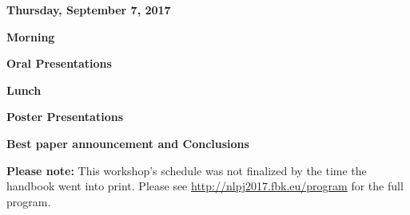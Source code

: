 
\item[] {\Large\bfseries Thursday, September 7, 2017}\\\vspace{1.5ex}

\vspace{1ex}
\item[] {\bfseries Morning}

\vspace{1ex}
\item[] {\bfseries Oral Presentations}
\item[$\bullet$] 
\item[$\bullet$] 
\item[$\bullet$] 
\item[$\bullet$] 
\item[$\bullet$] 
\item[$\bullet$] 
\item[$\bullet$] 
\item[$\bullet$] 
\item[$\bullet$] 

\vspace{1ex}
\item[] {\bfseries Lunch}

\vspace{1ex}
\item[] {\bfseries Poster Presentations}
\item[$\bullet$] 
\item[$\bullet$] 
\item[$\bullet$] 
\item[$\bullet$] 
\item[$\bullet$] 
\item[$\bullet$] 
\item[$\bullet$] 
\item[$\bullet$] 
\item[$\bullet$] 
\item[$\bullet$] 

\vspace{1ex}
\item[] {\bfseries Best paper announcement and Conclusions}

\vfill
\textbf{Please note:} This workshop's schedule was not finalized by the time the handbook went into print. Please see \url{http://nlpj2017.fbk.eu/program} for the full program.